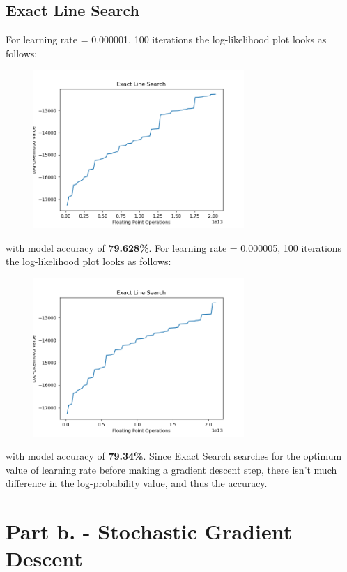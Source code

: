 \documentclass[a4paper]{article}
\begin{document}
\subsection*{Exact Line Search}
For learning rate = 0.000001, 100 iterations the log-likelihood plot looks as follows:

\begin{figure}[h!]
\centering
\includegraphics[width=8cm,height=6cm]{els_000001_100_79628.png}
\end{figure}

\noindent with model accuracy of \textbf{79.628\%}.
\vskip 0.1in
\noindent For learning rate = 0.000005, 100 iterations the log-likelihood plot looks as follows:

\begin{figure}[h!]
\centering
\includegraphics[width=8cm,height=6cm]{els_000005_100_7934.png}
\end{figure}

\noindent with model accuracy of \textbf{79.34\%}. 
\vskip 0.1in
\noindent Since Exact Search searches for the optimum value of learning rate before making a gradient descent step, there isn't much difference in the log-probability value, and thus the accuracy.

\section*{Part b. - Stochastic Gradient Descent}
\label{sec:partb}
\end{document}
